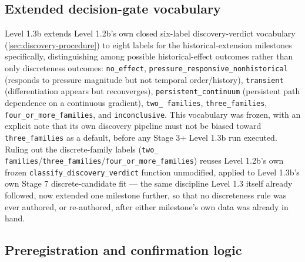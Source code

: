 \subsection{Extended decision-gate vocabulary}
\label{sec:decision-gate-extended}

Level 1.3b extends Level 1.2b's own closed six-label discovery-verdict
vocabulary (\cref{sec:discovery-procedure}) to eight labels for the
historical-extension milestones specifically, distinguishing among
possible historical-effect outcomes rather than only discreteness outcomes:
\texttt{no\_effect}, \texttt{pressure\_responsive\_nonhistorical} (responds
to pressure magnitude but not temporal order/history), \texttt{transient}
(differentiation appears but reconverges), \texttt{persistent\_continuum}
(persistent path dependence on a continuous gradient), \texttt{two\_%
families}, \texttt{three\_families}, \texttt{four\_or\_more\_families}, and
\texttt{inconclusive}. This vocabulary was frozen, with an explicit note
that its own discovery pipeline must not be biased toward
\texttt{three\_families} as a default, before any Stage 3+ Level 1.3b run
executed. Ruling out the discrete-family labels (\texttt{two\_%
families}/\texttt{three\_families}/\texttt{four\_or\_more\_families}) reuses
Level 1.2b's own frozen \texttt{classify\_discovery\_verdict} function
unmodified, applied to Level 1.3b's own Stage 7 discrete-candidate fit ---
the same discipline Level 1.3 itself already followed, now extended one
milestone further, so that no discreteness rule was ever authored, or
re-authored, after either milestone's own data was already in hand.

\subsection{Preregistration and confirmation logic}
\label{sec:preregistration-logic}

